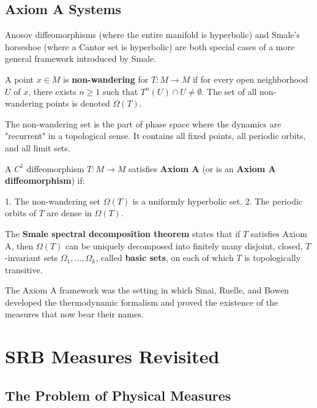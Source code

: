 \subsection{Axiom A Systems}\label{sec:12.1.4}

Anosov diffeomorphisms (where the entire manifold is hyperbolic) and Smale's horseshoe (where a Cantor set is hyperbolic) are both special cases of a more general framework introduced by Smale.

\begin{definition}\label{def:12.5}
A point $x \in M$ is \textbf{non-wandering} for $T: M \to M$ if for every open neighborhood $U$ of $x$, there exists $n \geq 1$ such that $T^n(U) \cap U \neq \emptyset$. The set of all non-wandering points is denoted $\Omega(T)$.

The non-wandering set is the part of phase space where the dynamics are "recurrent" in a topological sense. It contains all fixed points, all periodic orbits, and all limit sets.
\end{definition}


\begin{definition}[Axiom A]\label{def:12.6}
A $C^1$ diffeomorphism $T: M \to M$ satisfies \textbf{Axiom A} (or is an \textbf{Axiom A diffeomorphism}) if:

1. The non-wandering set $\Omega(T)$ is a uniformly hyperbolic set.
2. The periodic orbits of $T$ are dense in $\Omega(T)$.

The \textbf{Smale spectral decomposition theorem} states that if $T$ satisfies Axiom A, then $\Omega(T)$ can be uniquely decomposed into finitely many disjoint, closed, $T$-invariant sets $\Omega_1, \ldots, \Omega_k$, called \textbf{basic sets}, on each of which $T$ is topologically transitive.

The Axiom A framework was the setting in which Sinai, Ruelle, and Bowen developed the thermodynamic formalism and proved the existence of the measures that now bear their names.
\end{definition}


\section{SRB Measures Revisited}\label{sec:12.2}

\subsection{The Problem of Physical Measures}\label{sec:12.2.1}

